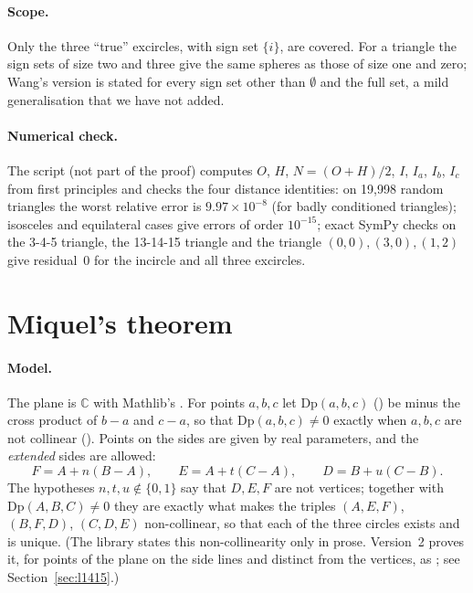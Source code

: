 \documentclass[11pt]{article}
\theoremstyle{definition}
\theoremstyle{remark}
\newcommand{\CC}{\mathbb{C}}
\begin{document}
\paragraph{Scope.} Only the three ``true'' excircles, with sign set $\{i\}$, are covered. For a
triangle the sign sets of size two and three give the same spheres as those of size one and
zero; Wang's version is stated for every sign set other than $\emptyset$ and the full set, a mild
generalisation that we have not added.

\paragraph{Numerical check.} The script  (not part of the proof)
computes $O$, $H$, $N=(O+H)/2$, $I$, $I_a$, $I_b$, $I_c$ from first principles and checks the four
distance identities: on 19{,}998 random triangles the worst relative error is $9.97\times10^{-8}$
(for badly conditioned triangles); isosceles and equilateral cases give errors of order $10^{-15}$;
exact SymPy checks on the 3-4-5 triangle, the 13-14-15 triangle and the triangle $(0,0),(3,0),(1,2)$
give residual~$0$ for the incircle and all three excircles.

\section{Miquel's theorem}\label{sec:miquel}

\paragraph{Model.} The plane is $\CC$ with Mathlib's . For points $a,b,c$ let
$\mathrm{Dp}(a,b,c)$ () be minus the cross product of $b-a$ and $c-a$, so that
$\mathrm{Dp}(a,b,c)\ne0$ exactly when $a,b,c$ are not collinear
(). Points on the sides are given by real parameters, and the
\emph{extended} sides are allowed:
\[
F=A+n(B-A),\qquad E=A+t(C-A),\qquad D=B+u(C-B).
\]
The hypotheses $n,t,u\notin\{0,1\}$ say that $D,E,F$ are not vertices; together with
$\mathrm{Dp}(A,B,C)\ne0$ they are exactly what makes the triples $(A,E,F)$, $(B,F,D)$, $(C,D,E)$
non-collinear, so that each of the three circles exists and is unique. (The library states this
non-collinearity only in prose. Version~2 proves it, for points of the plane on the side lines and
distinct from the vertices, as ; see Section~\ref{sec:l1415}.)
\end{document}

